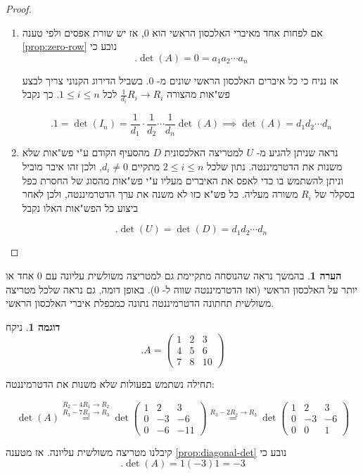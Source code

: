 \documentclass[12pt]{report}
\theoremstyle{plain}
\theoremstyle{definition}
\newtheorem{example}{דוגמה}[chapter]
\newtheorem{remark}{הערה}[chapter]
\newcommand{\0}{\mathbf{0}}
\begin{document}
\begin{proof}\
\begin{enumerate}[label=\alph*.]
\item 
אם לפחות אחד מאיברי האלכסון הראשי הוא 
$0$,
אז יש שורת אפסים ולפי טענה
\ref{prop:zero-row}
נובע כי
$$
.\det(A)=0=a_1a_2\cdots a_n
$$

אז נניח כי כל איברים האלכסון הראשי שונים מ-
$0$.
בשביל הדירוג הקנוני צריך לבצע 
פש"אות מהצורה
$\frac{1}{d_i}R_i\to R_i$
לכל 
$1\leq i\leq n$.
כך נקבל

$$
.1=\det(I_n)=\frac{1}{d_1}\cdot\frac{1}{d_2}\cdots\frac{1}{d_n}\det(A) \implies \det(A)=d_1d_2\cdots d_n
$$


\item 
נראה שניתן להגיע מ-
$U$
למטריצה האלכסונית
$D$
מהסעיף הקודם ע"י פש"אות שלא משנות את הדטרמיננטה. נתון שלכל
$2\leq i\leq n$
מתקיים
$d_i\neq 0$,
ולכן זהו איבר מוביל וניתן להשתמש בו כדי לאפס את האיברים מעליו ע"י פש"אות מהסוג של החסרת כפל בסקלר של 
$R_i$
משורה מעליה. כל פש"א כזו לא משנה את ערך הדטרמיננטה, ולכן לאחר ביצוע כל הפש"אות האלו נקבל

$$
.\det(U)=\det(D)=d_1d_2\cdots d_n
$$


\end{enumerate}
\end{proof}

\begin{remark}
בהמשך נראה שהנוסחה מתקיימת גם למטריצה משולשית עליונה עם 
$0$
אחד או יותר על האלכסון הראשי (ואז הדטרמיננטה שווה ל-
$0$).
באופן דומה, גם נראה שלכל מטריצה משולשית תחתונה הדטרמיננטה נתונה כמכפלת איברי האלכסון הראשי.
\end{remark}

\begin{example}
ניקח
$$
.A = \begin{pmatrix}
1 & 2 & 3\\
4 & 5 & 6\\
7 & 8 & 10
\end{pmatrix}
$$

תחילה נשתמש בפעולות שלא משנות את הדטרמיננטה:

$$
\det(A)\overset{R_2 - 4R_1 \to R_2}{\overset{R_3 - 7R_1 \to R_3}{=}}
\det\!\begin{pmatrix}
1 & 2 & 3\\
0 & -3 & -6\\
0 & -6 & -11
\end{pmatrix}\overset{R_3 - 2R_2 \to R_3}{=}\det\!\begin{pmatrix}
1 & 2 & 3\\
0 & -3 & -6\\
0 & 0 & 1
\end{pmatrix}
$$

קיבלנו מטריצה משולשית עליונה. אז מטענה
\ref{prop:diagonal-det}
נובע כי
$$
.\det(A)=1(-3)1=-3
$$

\end{example}
\end{document}
